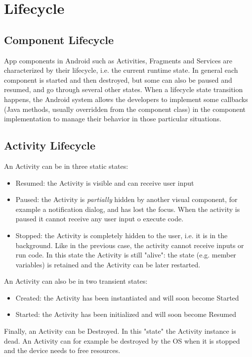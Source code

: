 \documentclass[11pt,a4paper,notitlepage]{article}
\begin{document}
\section{Lifecycle}

\subsection{Component Lifecycle}
App components in Android such as Activities, Fragments and Services are characterized by their lifecycle, i.e. the current runtime state. In general each component is started and then destroyed, but some can also be paused and resumed, and go through several other states. When a lifecycle state transition happens, the Android system allows the developers to implement some callbacks (Java methods, usually overridden from the component class) in the component implementation to manage their behavior in those particular situations.

\subsection{Activity Lifecycle}
An Activity can be in three static states:
\begin{itemize}
	\item Resumed: the Activity is visible and can receive user input
	\item Paused: the Activity is \textit{partially} hidden by another visual component, for example a notification dialog, and has lost the focus. When the activity is paused it cannot receive any user input o execute code.
	\item Stopped: the Activity is completely hidden to the user, i.e. it is in the background. Like in the previous case, the activity cannot receive inputs or run code. In this state the Activity is still "alive": the state (e.g. member variables) is retained and the Activity can be later restarted.
\end{itemize}
An Activity can also be in two transient states:
\begin{itemize}
	\item Created: the Activity has been instantiated and will soon become Started
	\item Started: the Activity has been initialized and will soon become Resumed
\end{itemize}
Finally, an Activity can be Destroyed. In this "state" the Activity instance is dead. An Activity can for example be destroyed by the OS when it is stopped and the device needs to free resources.\bigskip \\
\end{document}
